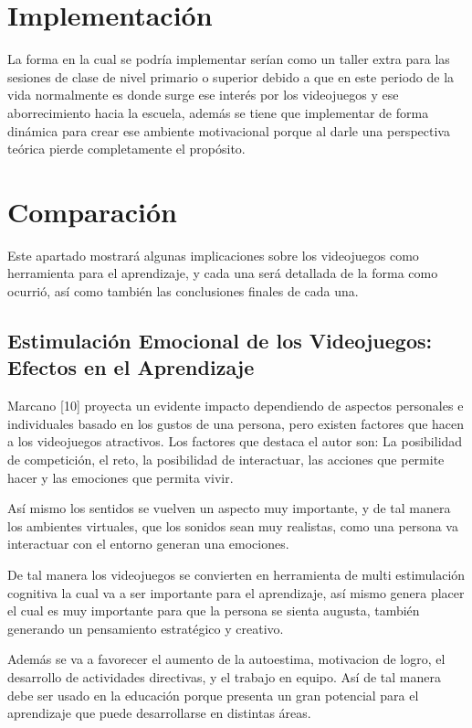 \documentclass[conference, letterpaper]{IEEEtran}
\begin{document}
\section{Implementación}
La forma en la cual se podría implementar serían como un taller extra para las sesiones de clase de nivel primario o superior 
debido a que en este periodo de la vida normalmente es donde surge ese interés por los videojuegos y ese aborrecimiento hacia la 
escuela, además se tiene que implementar de forma dinámica para crear ese ambiente motivacional porque al darle una perspectiva 
teórica pierde completamente el propósito. 
\section{Comparación}
Este apartado mostrará algunas implicaciones sobre los videojuegos como herramienta para el aprendizaje, y cada una será 
detallada de la forma como ocurrió, así como también las conclusiones finales de cada una.
\subsection{Estimulación Emocional de los Videojuegos: Efectos en el Aprendizaje} 
Marcano [10] proyecta un evidente impacto dependiendo de aspectos personales e individuales basado en los gustos de una persona, 
pero existen factores que hacen a los videojuegos atractivos. Los factores que destaca el autor son: La posibilidad de 
competición, el reto, la posibilidad de interactuar, las acciones que permite hacer y las emociones que permita vivir.
  
Así mismo los sentidos se vuelven un aspecto muy importante, y de tal manera los ambientes virtuales, que los sonidos sean muy  realistas, como una persona va interactuar con el entorno generan una emociones.

De tal manera los videojuegos se convierten en herramienta de multi estimulación cognitiva la cual va a ser importante para el 
aprendizaje, así mismo genera placer el cual es muy importante para que la persona se sienta augusta, también generando un 
pensamiento estratégico y creativo.  

Además se va a favorecer el aumento de la autoestima, motivacion de logro, el desarrollo de actividades directivas, y el trabajo 
en equipo. Así de tal manera debe ser usado en la educación porque presenta un gran potencial para el aprendizaje que puede 
desarrollarse en distintas áreas.  
\end{document}
